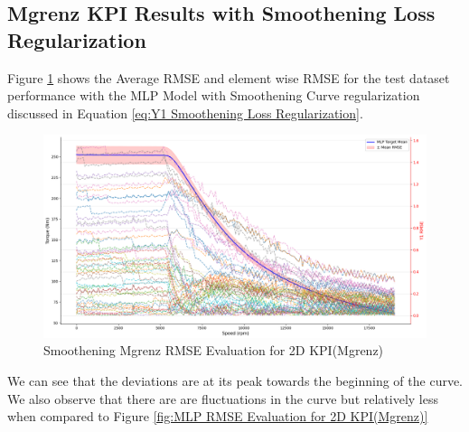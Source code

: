 \documentclass{report} %
\begin{document}
\subsection{Mgrenz \ac{KPI} Results with Smoothening Loss Regularization}\label{subsec:2D Mgrenz Results with Smoothening Loss Regularization}

Figure \ref{fig:Smoothening Mgrenz RMSE Evaluation for 2D KPI(Mgrenz)} shows the Average \ac{RMSE} and element wise \ac{RMSE} for the test dataset performance with the MLP Model with Smoothening Curve regularization discussed in Equation \ref{eq:Y1 Smoothening Loss Regularization}.\\

\begin{figure}[H]
    \centering
    \includegraphics[width=1\textwidth]{./ReportImages/RMSE_MLP_Smoothening_y1.png} 
    \caption{Smoothening Mgrenz \ac{RMSE} Evaluation for 2D KPI(Mgrenz)} 
    \label{fig:Smoothening Mgrenz RMSE Evaluation for 2D KPI(Mgrenz)}
\end{figure}

We can see that the deviations are at its peak towards the beginning of the curve. 
We also observe that there are are fluctuations in the curve but relatively less when compared to Figure \ref{fig:MLP RMSE Evaluation for 2D KPI(Mgrenz)}\\


\end{document}
